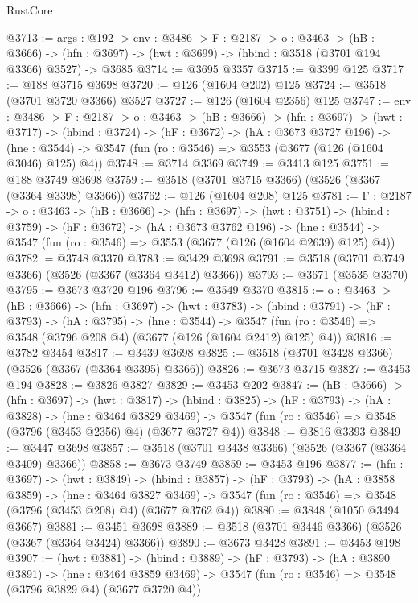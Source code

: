 \begin{lexlean}{RustCore}
\begin{coremodule}
@3713 := {args : @192} ->
  {env : @3486} ->
  {F : @2187} ->
  {o : @3463} ->
  (hB : @3666) ->
  (hfn : @3697) -> (hwt : @3699) -> (hbind : @3518 (@3701 @194 @3366) @3527) -> @3685
@3714 := @3695 @3357
@3715 := @3399 @125
@3717 := @188 @3715 @3698
@3720 := @126 (@1604 @202) @125
@3724 := @3518 (@3701 @3720 @3366) @3527
@3727 := @126 (@1604 @2356) @125
@3747 := {env : @3486} ->
  {F : @2187} ->
  {o : @3463} ->
  (hB : @3666) ->
  (hfn : @3697) ->
  (hwt : @3717) ->
  (hbind : @3724) ->
  (hF : @3672) ->
  (hA : @3673 @3727 @196) ->
  (hne : @3544) -> @3547 (fun (ro : @3546) => @3553 (@3677 (@126 (@1604 @3046) @125) @4))
@3748 := @3714 @3369
@3749 := @3413 @125
@3751 := @188 @3749 @3698
@3759 := @3518 (@3701 @3715 @3366) (@3526 (@3367 (@3364 @3398) @3366))
@3762 := @126 (@1604 @208) @125
@3781 := {F : @2187} ->
  {o : @3463} ->
  (hB : @3666) ->
  (hfn : @3697) ->
  (hwt : @3751) ->
  (hbind : @3759) ->
  (hF : @3672) ->
  (hA : @3673 @3762 @196) ->
  (hne : @3544) -> @3547 (fun (ro : @3546) => @3553 (@3677 (@126 (@1604 @2639) @125) @4))
@3782 := @3748 @3370
@3783 := @3429 @3698
@3791 := @3518 (@3701 @3749 @3366) (@3526 (@3367 (@3364 @3412) @3366))
@3793 := @3671 (@3535 @3370)
@3795 := @3673 @3720 @196
@3796 := @3549 @3370
@3815 := {o : @3463} ->
  (hB : @3666) ->
  (hfn : @3697) ->
  (hwt : @3783) ->
  (hbind : @3791) ->
  (hF : @3793) ->
  (hA : @3795) ->
  (hne : @3544) ->
  @3547 (fun (ro : @3546) => @3548 (@3796 @208 @4) (@3677 (@126 (@1604 @2412) @125) @4))
@3816 := @3782 @3454
@3817 := @3439 @3698
@3825 := @3518 (@3701 @3428 @3366) (@3526 (@3367 (@3364 @3395) @3366))
@3826 := @3673 @3715
@3827 := @3453 @194
@3828 := @3826 @3827
@3829 := @3453 @202
@3847 := (hB : @3666) ->
  (hfn : @3697) ->
  (hwt : @3817) ->
  (hbind : @3825) ->
  (hF : @3793) ->
  (hA : @3828) ->
  (hne : @3464 @3829 @3469) ->
  @3547 (fun (ro : @3546) => @3548 (@3796 (@3453 @2356) @4) (@3677 @3727 @4))
@3848 := @3816 @3393
@3849 := @3447 @3698
@3857 := @3518 (@3701 @3438 @3366) (@3526 (@3367 (@3364 @3409) @3366))
@3858 := @3673 @3749
@3859 := @3453 @196
@3877 := (hfn : @3697) ->
  (hwt : @3849) ->
  (hbind : @3857) ->
  (hF : @3793) ->
  (hA : @3858 @3859) ->
  (hne : @3464 @3827 @3469) ->
  @3547 (fun (ro : @3546) => @3548 (@3796 (@3453 @208) @4) (@3677 @3762 @4))
@3880 := @3848 (@1050 @3494 @3667)
@3881 := @3451 @3698
@3889 := @3518 (@3701 @3446 @3366) (@3526 (@3367 (@3364 @3424) @3366))
@3890 := @3673 @3428
@3891 := @3453 @198
@3907 := (hwt : @3881) ->
  (hbind : @3889) ->
  (hF : @3793) ->
  (hA : @3890 @3891) ->
  (hne : @3464 @3859 @3469) -> @3547 (fun (ro : @3546) => @3548 (@3796 @3829 @4) (@3677 @3720 @4))

\end{coremodule}
\end{lexlean}

